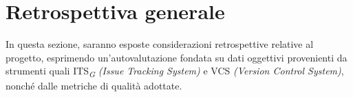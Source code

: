 \section{Retrospettiva generale}
In questa sezione, saranno esposte considerazioni retrospettive relative al progetto, esprimendo un'autovalutazione fondata su dati oggettivi provenienti da strumenti quali ITS\textsubscript{\textit{G}} \textit{(Issue Tracking System)} e VCS \textit{(Version Control System)}, nonché dalle metriche di qualità adottate. 




